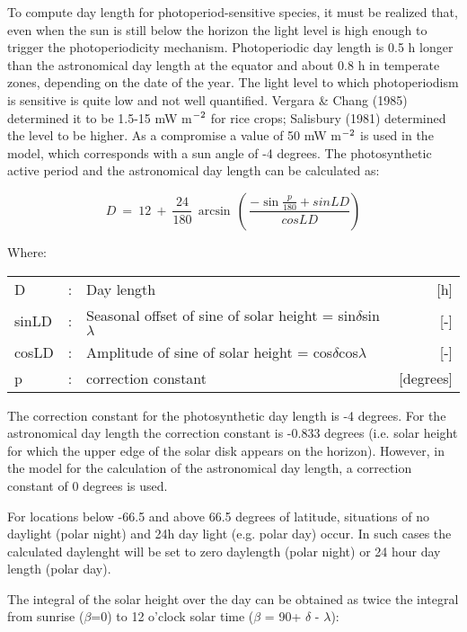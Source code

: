 To compute day length for photoperiod-sensitive species, it must be realized that, even
when the sun is still below the horizon the light level is high enough to trigger the
photoperiodicity mechan\-ism. Photoperiodic day length is 0.5 h longer than the 
astronomi\-cal day length at the equator and about 0.8 h in temperate zones, depending 
on the date of the year. The light level to which photoperiodism is sensitive is quite low and not well
quantified. Vergara \& Chang (1985) determined it to be 1.5-15 mW m$^{{\rm -2}}$ for 
rice crops; Salisbury (1981) determined the level to be higher. As a compromise a value of 50 mW
m$^{{\rm -2}}$ is used in the model, which corresponds with a sun angle of -4 degrees. The
photosynthetic active period and the astro\-nomical day length can be calculated as:

\begin{equation}
\label{eq:AstroDaylength}
D ~=~ 12~+~{\frac{24}{180}} \, \arcsin \, (\,{\frac{-\sin {\frac{p}{180}} + sinLD}{cosLD}} )
\end{equation}

Where:\\[5pt]
\begin{tabularx}{\textwidth}{llXr}
	D &:& Day length  & [h]\\
	sinLD &:& Seasonal offset of sine of solar height = sin$\delta$sin$\lambda$  & [-]\\
	cosLD &:& Amplitude of sine of solar height = cos$\delta$cos$\lambda$  & [-]\\
	p &:& correction constant  & [degrees]\\
\end{tabularx}

The correction constant for the photosynthetic day length is -4 degrees. For the astronomical 
day length the correction constant is -0.833 degrees (i.e. solar height for which
the upper edge of the solar disk appears on the horizon). However, in the model for the
calculation of the astronomical day length, a correction constant of 0 degrees is used. 

For locations below -66.5 and above 66.5 degrees of latitude, situations of no daylight (polar night) 
and 24h day light (e.g. polar day) occur. In such cases the calculated daylenght will be set
to zero daylength (polar night) or 24 hour day length (polar day). 

The integral of the solar height over the day can be obtained as twice the integral from
sunrise ($\beta$=0\degrees ) to 12 o'clock solar time ($\beta$ = 90\degrees  + $\delta$ - $\lambda$):

